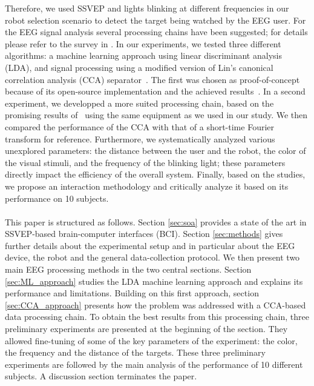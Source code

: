 \documentclass[smallextended]{svjour3}
\begin{document}
Therefore, we used SSVEP and lights blinking at different frequencies in our robot selection scenario to detect the target being watched by the EEG user. 
For the EEG signal analysis several processing chains have been suggested; for details please refer to the survey in \cite{Bi2013}. In our experiments, we tested three different algorithms: a machine learning approach using linear discriminant analysis (LDA), and signal processing using a modified version of Lin's canonical correlation analysis (CCA) separator~\cite{Lin2014}. 
The first was chosen as proof-of-concept because of its open-source implementation and the achieved results~\cite{openvibeSSVEP}. In a second experiment, we developped a more suited processing chain, based on the promising results of~\cite{Lin2014} using the same equipment as we used in our study.
We then compared the performance of the CCA with that of a short-time Fourier transform for reference.
Furthermore, we systematically analyzed various unexplored parameters: the distance between the user and the robot, the color of the visual stimuli, and the frequency of the blinking light; these parameters directly impact the efficiency of the overall system. 
Finally, based on the studies, we propose an interaction methodology and critically analyze it based on its performance on 10 subjects.\\
\\
This paper is structured as follows. Section \ref{sec:soa} provides a state of the art in SSVEP-based brain-computer interfaces (BCI). Section \ref{sec:methods} gives further details about the experimental setup and in particular about the EEG device, the robot and the general data-collection protocol. 
We then present two main EEG processing methods in the two central sections. Section \ref{sec:ML_approach} studies the LDA machine learning approach and explains its performance and limitations. Building on this first approach, section \ref{sec:CCA_approach} presents how the problem was addressed with a CCA-based data processing chain.
To obtain the best results from this processing chain, three preliminary experiments are presented at the beginning of the section.
They allowed fine-tuning of some of the key parameters of the experiment: the color, the frequency and the distance of the targets. These three preliminary experiments are followed by the main analysis of the performance of 10 different subjects. A discussion section terminates the paper.
\end{document}
